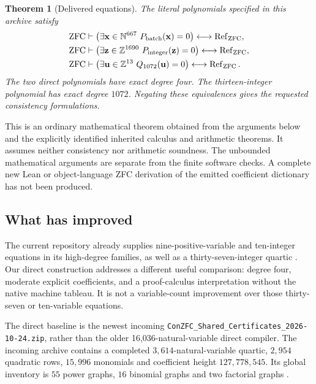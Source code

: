 \documentclass[11pt,letterpaper]{article}
\newtheorem{theorem}{Theorem}[section]
\newcommand{\N}{\mathbb N}
\newcommand{\Z}{\mathbb Z}
\newcommand{\ZFC}{\mathrm{ZFC}}
\newcommand{\file}[1]{\nolinkurl{#1}}
\begin{document}
\begin{theorem}[Delivered equations]
\label{thm:main}
The literal polynomials specified in this archive satisfy
\begin{align*}
 \ZFC&\vdash
 \bigl(\exists\mathbf x\in\N^{\NatVars}\ P_{\mathrm{batch}}(\mathbf x)=0\bigr)
       \longleftrightarrow\operatorname{Ref}_{\ZFC},\\
 \ZFC&\vdash
 \bigl(\exists\mathbf z\in\Z^{\IntVars}\ P_{\mathrm{integer}}(\mathbf z)=0\bigr)
       \longleftrightarrow\operatorname{Ref}_{\ZFC},\\
 \ZFC&\vdash
 \bigl(\exists\mathbf u\in\Z^{13}\ Q_{1072}(\mathbf u)=0\bigr)
       \longleftrightarrow\operatorname{Ref}_{\ZFC}.
\end{align*}
The two direct polynomials have exact degree four. The thirteen-integer
polynomial has exact degree $1072$. Negating these equivalences gives the
requested consistency formulations.
\end{theorem}

This is an ordinary mathematical theorem obtained from the arguments
below and the explicitly identified inherited calculus and arithmetic
theorems. It assumes neither consistency nor arithmetic soundness.
The unbounded mathematical arguments are separate from the finite
software checks. A complete new Lean or object-language ZFC derivation
of the emitted coefficient dictionary has not been produced.

\subsection{What has improved}

The current repository already supplies nine-positive-variable and
ten-integer equations in its high-degree families, as well as a
thirty-seven-integer quartic \cite{latest,wave11}. Our direct construction
addresses a different useful comparison: degree four, moderate explicit
coefficients, and a proof-calculus interpretation without the native
machine tableau. It is not a variable-count improvement over those
thirty-seven or ten-variable equations.

The direct baseline is the newest incoming
\file{ConZFC_Shared_Certificates_2026-10-24.zip}, rather than the older
16,036-natural-variable direct compiler. The incoming archive contains
a completed $3,614$-natural-variable quartic, $2,954$ quadratic rows,
$15,996$ monomials and coefficient height $127,778,545$.
Its global inventory is $55$ power graphs, $16$ binomial
graphs and two factorial graphs \cite{shared}.
\end{document}
